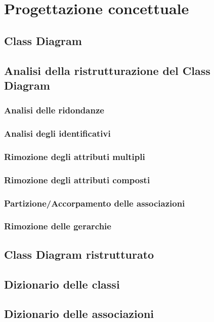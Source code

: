 \chapter{Progettazione concettuale}
    \section{Class Diagram}
        
    \section{Analisi della ristrutturazione del Class Diagram}
        
        \subsection{Analisi delle ridondanze}
            
        \subsection{Analisi degli identificativi}
            
        \subsection{Rimozione degli attributi multipli}
            
        \subsection{Rimozione degli attributi composti}
            
        \subsection{Partizione/Accorpamento delle associazioni}
            
        \subsection{Rimozione delle gerarchie}
    
    \section{Class Diagram ristrutturato}
        
    \section{Dizionario delle classi}
        
    \section{Dizionario delle associazioni}